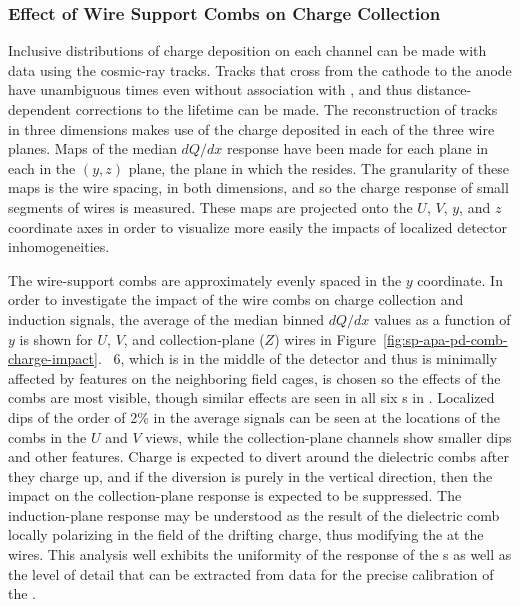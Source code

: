 \subsubsection{Effect of Wire Support Combs on Charge Collection}
\label{sec:fdsp-apa-qa-protodune-ops-combs-charge}

Inclusive distributions of charge deposition on each channel can be made with  data using the cosmic-ray tracks.  Tracks that cross from the cathode to the anode have unambiguous times even without association with , and thus distance-dependent corrections to the lifetime can be made.  The reconstruction of tracks in three dimensions makes use of the charge deposited in each of the three wire planes.  Maps of the median $dQ/dx$ response have been made for each plane in each  in the $(y,z)$ plane, the plane in which the  resides.  The granularity of these maps is the wire spacing, in both dimensions, and so the charge response of small segments of wires is measured.  These maps are projected onto the $U$, $V$, $y$, and $z$ coordinate axes in order to visualize more easily the impacts of localized detector inhomogeneities.

The wire-support combs are approximately evenly spaced in the $y$ coordinate.  In order to investigate the impact of the wire combs on charge collection and induction signals, the average of the median binned $dQ/dx$ values as a function of $y$ is shown for $U$, $V$, and collection-plane ($Z$) wires in Figure~\ref{fig:sp-apa-pd-comb-charge-impact}.  ~6, which is in the middle of the detector and thus is minimally affected by features on the neighboring field cages, is chosen so the effects of the combs are most visible, though similar effects are seen in all six s in .  Localized dips of the order of 2\% in the average signals can be seen at the locations of the combs in the $U$ and $V$ views, while the collection-plane channels show smaller dips and other features.  Charge is expected to divert around the dielectric combs after they charge up, and if the diversion is purely in the vertical direction, then the impact on the collection-plane response is expected to be suppressed.  The induction-plane response may be understood as the result of the dielectric comb locally polarizing in the field of the drifting charge, thus modifying the \efield at the wires.  This analysis well exhibits the uniformity of the response of the  s as well as the level of detail that can be extracted from  data for the precise calibration of the .

